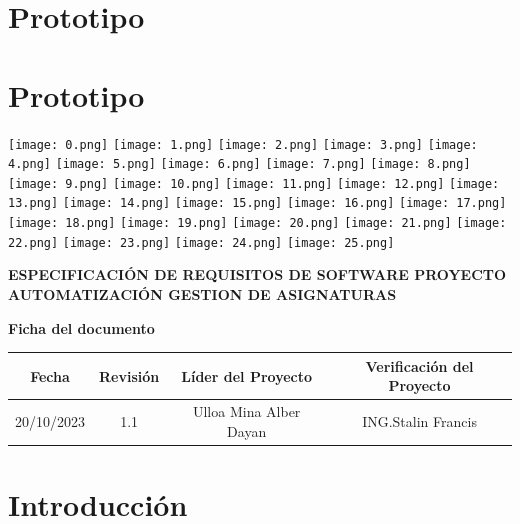 \documentclass[11pt]{article}
\begin{document}
\section{Prototipo}
\section{Prototipo}
\texttt{[image: 0.png]}
\texttt{[image: 1.png]}
\texttt{[image: 2.png]}
\texttt{[image: 3.png]}
\texttt{[image: 4.png]}
\texttt{[image: 5.png]}
\texttt{[image: 6.png]}
\texttt{[image: 7.png]}
\texttt{[image: 8.png]}
\texttt{[image: 9.png]}
\texttt{[image: 10.png]}
\texttt{[image: 11.png]}
\texttt{[image: 12.png]}
\texttt{[image: 13.png]}
\texttt{[image: 14.png]}
\texttt{[image: 15.png]}
\texttt{[image: 16.png]}
\texttt{[image: 17.png]}
\texttt{[image: 18.png]}
\texttt{[image: 19.png]}
\texttt{[image: 20.png]}
\texttt{[image: 21.png]}
\texttt{[image: 22.png]}
\texttt{[image: 23.png]}
\texttt{[image: 24.png]}
\texttt{[image: 25.png]}
\newpage

\vspace{2cm} 
\begin{center}
\Huge 
\textbf{ESPECIFICACIÓN DE REQUISITOS DE SOFTWARE
PROYECTO AUTOMATIZACIÓN GESTION DE
ASIGNATURAS}
\end{center}

\newpage

\Huge
\textbf{Ficha del documento}
\vspace{7cm}

\normalsize

\begin{tabular}{|c|c|c|c|}
\hline
Fecha & Revisión & Líder del Proyecto & Verificación del Proyecto \\
\hline
\multirow{8}{}{20/10/2023} & \multirow{8}{}{1.1} & \multirow{8}{}{Ulloa Mina Alber Dayan} & \multirow{8}{}{ING.Stalin Francis} \\
& & & \\
& & & \\
& & & \\
& & & \\
& & & \\
& & & \\
& & & \\
\hline
\end{tabular}

\newpage


\section{\textbf{Introducción}}
\end{document}
